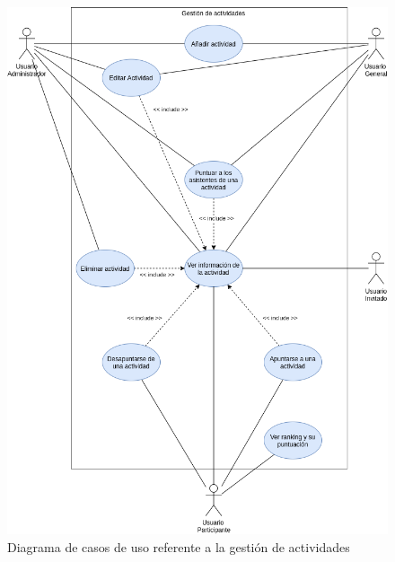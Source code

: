 \begin{figure}[h!]
    \centering
    \includegraphics[width=1\linewidth]{diseno/sistema/CU/actividades.png}
    \caption{Diagrama de casos de uso referente a la gestión de actividades}
    \label{fig:cu_actividades}
\end{figure}

